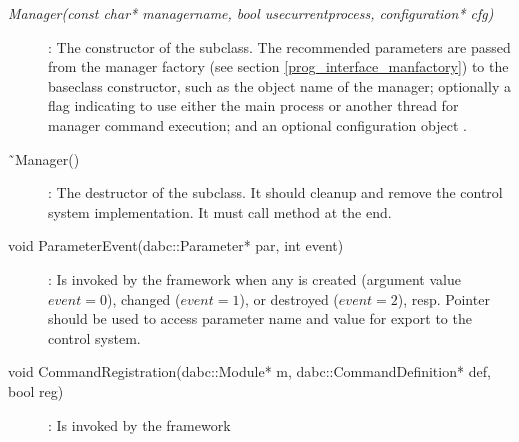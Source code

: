 \begin{description}

\item[\em Manager(const char* managername,  bool usecurrentprocess, configuration* cfg)] :
The constructor of the subclass. The recommended parameters 
are passed from the manager factory (see section \ref{prog_interface_manfactory})
to the baseclass constructor, such as
the object name of the manager; optionally a
flag indicating to use either the main process or another thread for manager 
command execution;
and an optional configuration object .


     
\item[\~{~}Manager()] :
The destructor of the subclass. It should cleanup and remove the  
control system implementation. It must call method 
at the end.    


\item[void ParameterEvent(dabc::Parameter* par, int event)] :
Is invoked by the framework when any  is created 
(argument value $event=0$),  changed ($event=1$),
or destroyed ($event=2$), resp. Pointer  should be used to access parameter
name and value for export to the control system. 

\item[void CommandRegistration(dabc::Module* m, dabc::CommandDefinition* def, bool reg)] :
Is invoked by the framework




\end{description}
